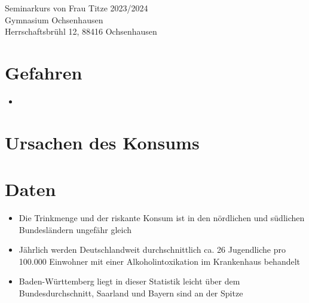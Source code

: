 \documentclass[12pt]{article}
\begin{document}
\begin{titlepage}
\begin{center}
%
%
%
%
%
%
%
        \large
        \vspace{2cm}
        Seminarkurs von Frau Titze 2023/2024\\
        Gymnasium Ochsenhausen\\
        Herrschaftsbrühl 12, 88416 Ochsenhausen\\
             
    \end{center}
 \end{titlepage}

 \clearpage

 \section*{Gefahren}
 \begin{itemize}
    \item 
 \end{itemize}

 \section*{Ursachen des Konsums}

 \section*{Daten}
 \begin{itemize}
    \item Die Trinkmenge und der riskante Konsum ist in den nördlichen und südlichen Bundesländern ungefähr gleich
    \item Jährlich werden Deutschlandweit durchschnittlich ca. 26 Jugendliche pro 100.000 Einwohner mit einer Alkoholintoxikation im Krankenhaus behandelt
    \item Baden-Württemberg liegt in dieser Statistik leicht über dem Bundesdurchschnitt, Saarland und Bayern sind an der Spitze
 \end{itemize}
 
\end{document}
